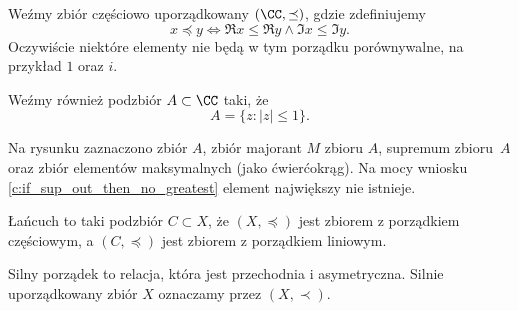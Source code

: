 \begin{example}
    Weźmy zbiór częściowo uporządkowany $(\CC, \preceq)$, gdzie zdefiniujemy
    $$ x \preceq y \iff \Re{x} \leq \Re{y} \wedge \Im{x} \leq \Im{y}. $$
    Oczywiście niektóre elementy nie będą w tym porządku porównywalne, na przykład $1$ oraz $i$.

    Weźmy również podzbiór $A \subset \CC$ taki, że
    $$ A = \{z : |z| \leq 1\}. $$

    Na rysunku zaznaczono \textcolor{MainColor1}{zbiór $A$}, \textcolor{LinkColor1}{zbiór majorant $M$ zbioru $A$}, \textcolor{BoxColor1}{supremum zbioru~$A$} oraz \textcolor{MainColor1}{zbiór elementów maksymalnych} (jako ćwierćokrąg). Na mocy wniosku \ref{c:if_sup_out_then_no_greatest} element największy nie istnieje.

    \begin{center}
    \end{center}
\end{example}

\begin{definition}
    Łańcuch to taki podzbiór $C \subset X$, że $(X, \preceq)$ jest zbiorem z porządkiem częściowym, a $(C, \preceq)$ jest zbiorem z porządkiem liniowym.
\end{definition}

\begin{definition}
    Silny porządek to relacja, która jest przechodnia i asymetryczna. Silnie uporządkowany zbiór $X$ oznaczamy przez $(X, \prec)$.
\end{definition}